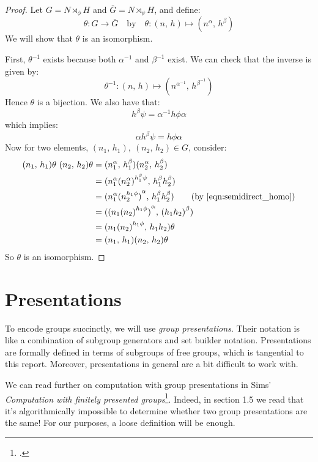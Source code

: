 \begin{proof}
    Let \(G = N \rtimes_\phi H\) and \(\bar{G} = N \rtimes_\psi H\), and define:
    \[\theta:G \to \bar{G} \quad \text{by} \quad \theta:(n,\,h) \mapsto (n^\alpha,\,h^\beta)\]
    We will show that \(\theta\) is an isomorphism.

    First, \(\theta^{-1}\) exists because both \(\alpha^{-1}\) and \(\beta^{-1}\) exist.
    We can check that the inverse is given by:
    \[\theta^{-1}:(n,\,h) \mapsto (n^{\alpha^{-1}},\,h^{\beta^{-1}})\]
    Hence \(\theta\) is a bijection.
    We also have that:
    \[h^\beta\psi = \alpha^{-1}h\phi\alpha\]
    which implies:
    \[\alpha h^\beta\psi = h\phi\alpha \tag{\ast}\label{eqn:semidirect_homo}\]
    Now for two elements, \((n_1,\,h_1),\ (n_2,\,h_2) \in G\), consider:
    \begin{align*}
        (n_1,\, h_1)\theta\ (n_2,\, h_2)\theta &= (n_1^\alpha,\, h_1^\beta)(n_2^\alpha,\, h_2^\beta) \\
        &= (n_1^\alpha {(n_2^\alpha)}^{h_1^\beta\psi},\, h_1^\beta h_2^\beta) \\
        &= (n_1^\alpha {(n_2^{h_1\phi})}^\alpha,\, h_1^\beta h_2^\beta) \tag{by~\ref{eqn:semidirect_homo}} \\
        &= ({(n_1 {(n_2)}^{h_1\phi})}^\alpha,\, {(h_1 h_2)}^\beta) \\
        &= (n_1 {(n_2)}^{h_1\phi},\, h_1 h_2)\theta \\
        &= (n_1,\, h_1)(n_2,\, h_2)\theta
    \end{align*}
    So \(\theta\) is an isomorphism.
\end{proof}


\section{Presentations}
To encode groups succinctly, we will use \emph{group presentations}.
Their notation is like a combination of subgroup generators and set builder notation.
Presentations are formally defined in terms of subgroups of free groups, which is tangential to this report.
Moreover, presentations in general are a bit difficult to work with.

We can read further on computation with group presentations in Sims' \textit{Computation with finitely presented
groups}\footcite{sims1994}.
Indeed, in section 1.5 we read that it's algorithmically impossible to determine whether two group presentations are the same!
For our purposes, a loose definition will be enough.


